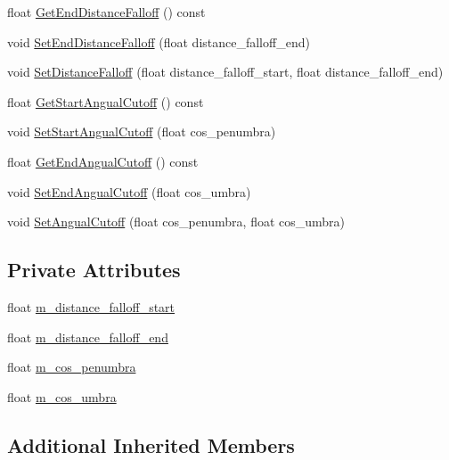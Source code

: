 \begin{DoxyCompactItemize}
\item 
float \hyperlink{classmage_1_1_spot_light_a3e6767992846e17a9bebb66519c30f19}{Get\+End\+Distance\+Falloff} () const
\item 
void \hyperlink{classmage_1_1_spot_light_a12ffc1d8365297de853041dd652c7039}{Set\+End\+Distance\+Falloff} (float distance\+\_\+falloff\+\_\+end)
\item 
void \hyperlink{classmage_1_1_spot_light_a0846a1af219d18c711d165c8cea57e88}{Set\+Distance\+Falloff} (float distance\+\_\+falloff\+\_\+start, float distance\+\_\+falloff\+\_\+end)
\item 
float \hyperlink{classmage_1_1_spot_light_abe143425da28281b7b72643bd2f1c5c2}{Get\+Start\+Angual\+Cutoff} () const
\item 
void \hyperlink{classmage_1_1_spot_light_a5059fe33404d452a57584e8473de8be4}{Set\+Start\+Angual\+Cutoff} (float cos\+\_\+penumbra)
\item 
float \hyperlink{classmage_1_1_spot_light_ac04202c48cb4c12334f9f55757a3d73a}{Get\+End\+Angual\+Cutoff} () const
\item 
void \hyperlink{classmage_1_1_spot_light_aac3d213799cf442a993134ca186fcd8a}{Set\+End\+Angual\+Cutoff} (float cos\+\_\+umbra)
\item 
void \hyperlink{classmage_1_1_spot_light_a251358633eff92a9a77f5cc251dc1881}{Set\+Angual\+Cutoff} (float cos\+\_\+penumbra, float cos\+\_\+umbra)
\end{DoxyCompactItemize}
\subsection*{Private Attributes}
\begin{DoxyCompactItemize}
\item 
float \hyperlink{classmage_1_1_spot_light_a96c4a4f1b77c9a6aadb82cf48248cc5d}{m\+\_\+distance\+\_\+falloff\+\_\+start}
\item 
float \hyperlink{classmage_1_1_spot_light_a8e0616e3a36d1a05d800cc4a43739178}{m\+\_\+distance\+\_\+falloff\+\_\+end}
\item 
float \hyperlink{classmage_1_1_spot_light_ac5d9f3426397abff72c5098b6e7e8472}{m\+\_\+cos\+\_\+penumbra}
\item 
float \hyperlink{classmage_1_1_spot_light_a9afab31514f93d702f9e516491f262f2}{m\+\_\+cos\+\_\+umbra}
\end{DoxyCompactItemize}
\subsection*{Additional Inherited Members}


